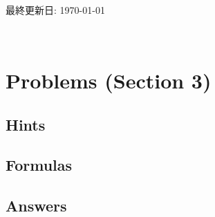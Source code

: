 

\pagestyle{fancy}%
\fancyhead[L]{\textsc{\rightmark}}%
%  
\fancyhead[R]{\thepage}
\fancyfoot{}%
\renewcommand{\contentsname}{Contents}%
\newcommand{\toi}[1]{\noindent\fbox{\large\color{blue}{#1}}\\\nopagebreak}
\newcommand{\itemlabel}[1]{\noindent\uline{#1}\,\nopagebreak}


\nocite{*}

\hrulefill\\

\begin{flushright}%
  最終更新日: \today
\end{flushright}%


\setcounter{section}{2}
\tableofcontents
\hrulefill\\

\section{Problems (Section 3)}

\subsection{Hints}


\clearpage
\subsection{Formulas}


\clearpage
\subsection{Answers}





